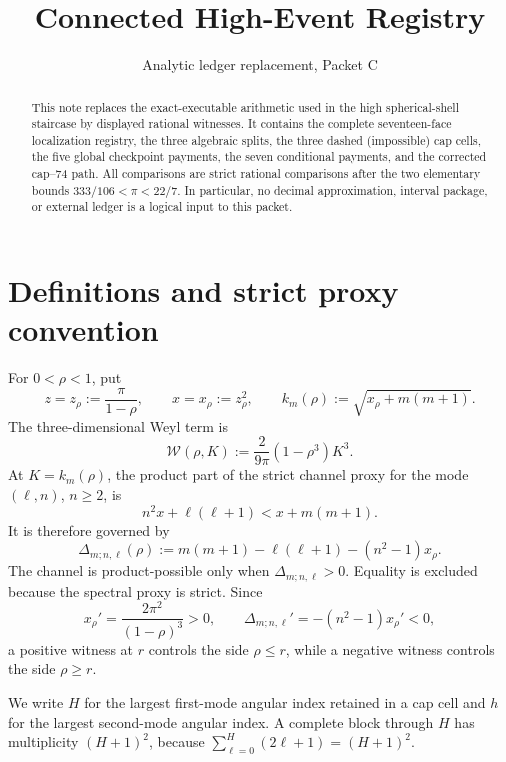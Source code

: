 \documentclass[11pt]{article}
\title{Connected High-Event Registry}
\author{}
\date{Analytic ledger replacement, Packet C}
\newcommand{\W}{\mathcal W}
\newcommand{\Dlt}{\Delta}
\begin{document}
\maketitle

\begin{abstract}
This note replaces the exact-executable arithmetic used in the high
spherical-shell staircase by displayed rational witnesses.  It contains
the complete seventeen-face localization registry, the three algebraic
splits, the three dashed (impossible) cap cells, the five global checkpoint
payments, the seven conditional payments, and the corrected cap--74 path.
All comparisons are strict rational comparisons after the two elementary
bounds \(333/106<\pi<22/7\).  In particular, no decimal approximation,
interval package, or external ledger is a logical input to this packet.
\end{abstract}

\section{Definitions and strict proxy convention}

For \(0<\rho<1\), put
\begin{equation}
 z=z_\rho:=\frac{\pi}{1-\rho},\qquad
 x=x_\rho:=z_\rho^2,\qquad
 k_m(\rho):=\sqrt{x_\rho+m(m+1)}.
 \label{eq:def-z-k}
\end{equation}
The three-dimensional Weyl term is
\begin{equation}
 \W(\rho,K):=\frac{2}{9\pi}(1-\rho^3)K^3.
 \label{eq:def-W}
\end{equation}
At \(K=k_m(\rho)\), the product part of the strict channel proxy for the
mode \((\ell,n)\), \(n\geq2\), is
\[
 n^2x+\ell(\ell+1)<x+m(m+1).
\]
It is therefore governed by
\begin{equation}
 \Dlt_{m;n,\ell}(\rho)
 :=m(m+1)-\ell(\ell+1)-(n^2-1)x_\rho.
 \label{eq:delta}
\end{equation}
The channel is product-possible only when \(\Dlt_{m;n,\ell}>0\).
Equality is excluded because the spectral proxy is strict.  Since
\begin{equation}
 x_\rho'=\frac{2\pi^2}{(1-\rho)^3}>0,
 \qquad
 \Dlt_{m;n,\ell}'=-(n^2-1)x_\rho'<0,
 \label{eq:delta-monotone}
\end{equation}
a positive witness at \(r\) controls the side \(\rho\leq r\), while a
negative witness controls the side \(\rho\geq r\).

We write \(H\) for the largest first-mode angular index retained in a cap
cell and \(h\) for the largest second-mode angular index.  A complete block
through \(H\) has multiplicity \((H+1)^2\), because
\(\sum_{\ell=0}^{H}(2\ell+1)=(H+1)^2\).
\end{document}
